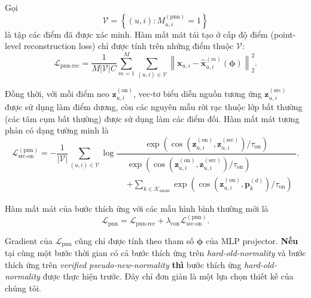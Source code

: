 Gọi
\begin{equation}
\mathcal{V}
=
\left\{
(u,i):
M^{(\mathrm{pnn})}_{u,i}=1
\right\}
\end{equation}
là tập các điểm đã được xác minh. Hàm mất mát tái tạo ở cấp độ điểm (point-level reconstruction loss) chỉ được tính trên những điểm thuộc \(\mathcal{V}\):
\begin{equation}
\mathcal{L}_{\mathrm{pnn\text{-}rec}}
=
\frac{1}{M|\mathcal{V}|C}
\sum_{m=1}^{M}
\sum_{(u,i)\in\mathcal{V}}
\left\|
\mathbf{x}_{u,i}
-
\widehat{\mathbf{x}}^{(m)}_{u,i}
\left(\boldsymbol{\phi}\right)
\right\|_2^2.
\end{equation}

Đồng thời, với mỗi điểm neo
\(\mathbf{z}^{(\mathrm{on})}_{u,i}\), vec-tơ biểu diễn nguồn tương ứng
\(\mathbf{z}^{(\mathrm{src})}_{u,i}\) được sử dụng làm điểm dương, còn các
nguyên mẫu rời rạc thuộc lớp bất thường (các tâm cụm bất thường) được sử dụng làm các điểm đối. Hàm
mất mát tương phản có dạng tường minh là
\begin{equation}
\mathcal{L}^{(\mathrm{pnn})}_{\mathrm{src\text{-}on}}
=
-\frac{1}{|\mathcal{V}|}
\sum_{(u,i)\in\mathcal{V}}
\log
\frac{
\exp\left(
\operatorname{cos}\left(
\mathbf{z}^{(\mathrm{on})}_{u,i},
\mathbf{z}^{(\mathrm{src})}_{u,i}
\right)
/\tau_{\mathrm{on}}
\right)
}{
\begin{aligned}
&
\exp\left(
\operatorname{cos}\left(
\mathbf{z}^{(\mathrm{on})}_{u,i},
\mathbf{z}^{(\mathrm{src})}_{u,i}
\right)
/\tau_{\mathrm{on}}
\right)
\\
&+
\sum_{k\in\mathcal{K}_{\mathrm{anom}}}
\exp\left(
\operatorname{cos}\left(
\mathbf{z}^{(\mathrm{on})}_{u,i},
\mathbf{p}^{(d)}_k
\right)
/\tau_{\mathrm{on}}
\right)
\end{aligned}
}.
\end{equation}

Hàm mất mát của bước thích ứng với các mẫu hình bình thường mới là
\begin{equation}
\mathcal{L}_{\mathrm{pnn}}
=
\mathcal{L}_{\mathrm{pnn\text{-}rec}}
+
\lambda_{\mathrm{con}}
\mathcal{L}^{(\mathrm{pnn})}_{\mathrm{src\text{-}on}}.
\end{equation}

Gradient của \(\mathcal{L}_{\mathrm{pnn}}\) cũng chỉ được tính theo tham số
\(\boldsymbol{\phi}\) của MLP projector. \textbf{Nếu} tại cùng một bước thời gian có cả
bước thích ứng trên \textit{hard-old-normality} và bước thích ứng trên
\textit{verified pseudo-new-normality} \textbf{thì} bước thích ứng \textit{hard-old-normality} được thực hiện trước. Đây chỉ đơn giản là một lựa chọn thiết kế của chúng tôi.